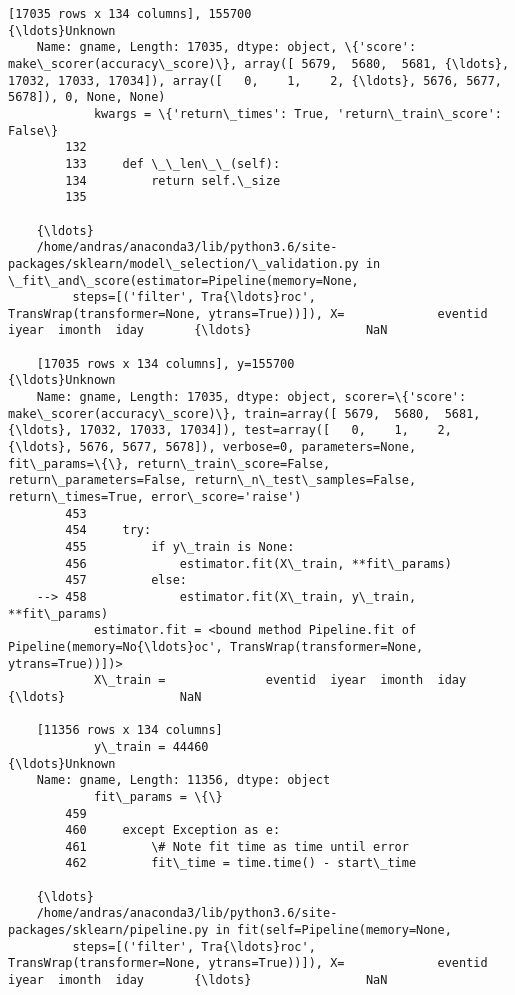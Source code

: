 \documentclass[11pt]{article}
\begin{document}
\begin{Verbatim}[commandchars=\\\{\}]
    [17035 rows x 134 columns], 155700                                          {\ldots}Unknown
    Name: gname, Length: 17035, dtype: object, \{'score': make\_scorer(accuracy\_score)\}, array([ 5679,  5680,  5681, {\ldots}, 17032, 17033, 17034]), array([   0,    1,    2, {\ldots}, 5676, 5677, 5678]), 0, None, None)
            kwargs = \{'return\_times': True, 'return\_train\_score': False\}
        132 
        133     def \_\_len\_\_(self):
        134         return self.\_size
        135 
    
    {\ldots}
    /home/andras/anaconda3/lib/python3.6/site-packages/sklearn/model\_selection/\_validation.py in \_fit\_and\_score(estimator=Pipeline(memory=None,
         steps=[('filter', Tra{\ldots}roc', TransWrap(transformer=None, ytrans=True))]), X=             eventid  iyear  imonth  iday       {\ldots}                NaN  
    
    [17035 rows x 134 columns], y=155700                                          {\ldots}Unknown
    Name: gname, Length: 17035, dtype: object, scorer=\{'score': make\_scorer(accuracy\_score)\}, train=array([ 5679,  5680,  5681, {\ldots}, 17032, 17033, 17034]), test=array([   0,    1,    2, {\ldots}, 5676, 5677, 5678]), verbose=0, parameters=None, fit\_params=\{\}, return\_train\_score=False, return\_parameters=False, return\_n\_test\_samples=False, return\_times=True, error\_score='raise')
        453 
        454     try:
        455         if y\_train is None:
        456             estimator.fit(X\_train, **fit\_params)
        457         else:
    --> 458             estimator.fit(X\_train, y\_train, **fit\_params)
            estimator.fit = <bound method Pipeline.fit of Pipeline(memory=No{\ldots}oc', TransWrap(transformer=None, ytrans=True))])>
            X\_train =              eventid  iyear  imonth  iday       {\ldots}                NaN  
    
    [11356 rows x 134 columns]
            y\_train = 44460                                           {\ldots}Unknown
    Name: gname, Length: 11356, dtype: object
            fit\_params = \{\}
        459 
        460     except Exception as e:
        461         \# Note fit time as time until error
        462         fit\_time = time.time() - start\_time
    
    {\ldots}
    /home/andras/anaconda3/lib/python3.6/site-packages/sklearn/pipeline.py in fit(self=Pipeline(memory=None,
         steps=[('filter', Tra{\ldots}roc', TransWrap(transformer=None, ytrans=True))]), X=             eventid  iyear  imonth  iday       {\ldots}                NaN  
    

\end{Verbatim}
\end{document}
